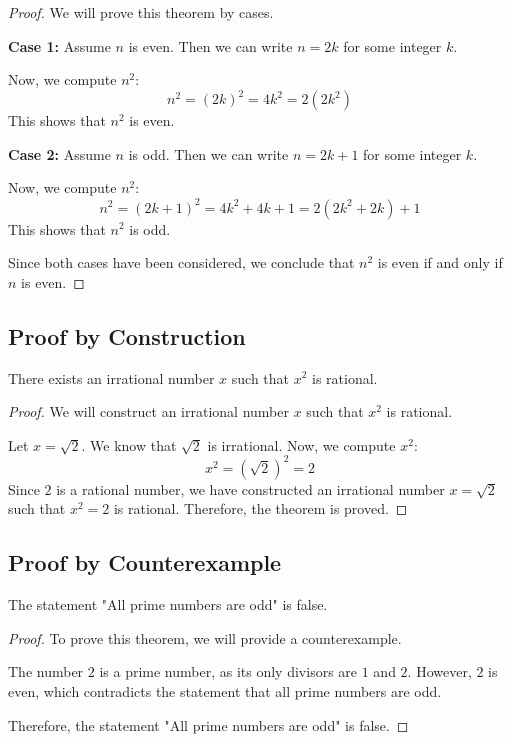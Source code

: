 \begin{proof}
    We will prove this theorem by cases.

    \textbf{Case 1:} Assume \( n \) is even. Then we can write \( n = 2k \) for some integer \( k \). 

    Now, we compute \( n^2 \):
    \[
    n^2 = (2k)^2 = 4k^2 = 2(2k^2)
    \]
    This shows that \( n^2 \) is even.

    \textbf{Case 2:} Assume \( n \) is odd. Then we can write \( n = 2k + 1 \) for some integer \( k \). 

    Now, we compute \( n^2 \):
    \[
    n^2 = (2k + 1)^2 = 4k^2 + 4k + 1 = 2(2k^2 + 2k) + 1
    \]
    This shows that \( n^2 \) is odd.

    Since both cases have been considered, we conclude that \( n^2 \) is even if and only if \( n \) is even.
\end{proof}
\subsection{Proof by Construction} 

    There exists an irrational number \( x \) such that \( x^2 \) is rational.

\begin{proof}
    We will construct an irrational number \( x \) such that \( x^2 \) is rational.

    Let \( x = \sqrt{2} \). We know that \( \sqrt{2} \) is irrational. Now, we compute \( x^2 \):
    \[
    x^2 = (\sqrt{2})^2 = 2
    \]
    Since \( 2 \) is a rational number, we have constructed an irrational number \( x = \sqrt{2} \) such that \( x^2 = 2 \) is rational.
    Therefore, the theorem is proved.
\end{proof}
\subsection{Proof by Counterexample}

    The statement "All prime numbers are odd" is false.
 
\begin{proof}
    To prove this theorem, we will provide a counterexample.

    The number \( 2 \) is a prime number, as its only divisors are \( 1 \) and \( 2 \). However, \( 2 \) is even, which contradicts the statement that all prime numbers are odd.

    Therefore, the statement "All prime numbers are odd" is false.
\end{proof}
